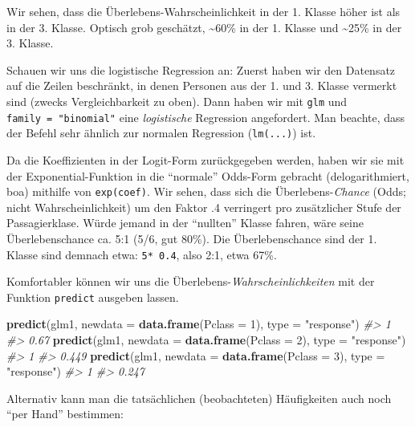 \documentclass[12pt,ngerman,]{book}
\makeatletter
\newenvironment{Shaded}{\begin{snugshade}}{\end{snugshade}}
\newcommand{\KeywordTok}[1]{\textcolor[rgb]{0.13,0.29,0.53}{\textbf{#1}}}
\newcommand{\DataTypeTok}[1]{\textcolor[rgb]{0.13,0.29,0.53}{#1}}
\newcommand{\DecValTok}[1]{\textcolor[rgb]{0.00,0.00,0.81}{#1}}
\newcommand{\StringTok}[1]{\textcolor[rgb]{0.31,0.60,0.02}{#1}}
\newcommand{\CommentTok}[1]{\textcolor[rgb]{0.56,0.35,0.01}{\textit{#1}}}
\newcommand{\NormalTok}[1]{#1}
\newenvironment{kframe}{%
\medskip{}
\setlength{\fboxsep}{.8em}
 \def\at@end@of@kframe{}%
 \ifinner\ifhmode%
  \def\at@end@of@kframe{\end{minipage}}%
  \begin{minipage}{\columnwidth}%
 \fi\fi%
 \def\FrameCommand##1{\hskip\@totalleftmargin \hskip-\fboxsep
 \colorbox{shadecolor}{##1}\hskip-\fboxsep
     \hskip-\linewidth \hskip-\@totalleftmargin \hskip\columnwidth}%
 \MakeFramed {\advance\hsize-\width
   \@totalleftmargin\z@ \linewidth\hsize
   \@setminipage}}%
 {\par\unskip\endMakeFramed%
 \at@end@of@kframe}
\renewenvironment{Shaded}{\begin{kframe}}{\end{kframe}}
\theoremstyle{definition}
\theoremstyle{definition}
\theoremstyle{remark}
\makeatother
\begin{document}
Wir sehen, dass die Überlebens-Wahrscheinlichkeit in der 1. Klasse höher
ist als in der 3. Klasse. Optisch grob geschätzt, \textasciitilde{}60\%
in der 1. Klasse und \textasciitilde{}25\% in der 3. Klasse.

Schauen wir uns die logistische Regression an: Zuerst haben wir den
Datensatz auf die Zeilen beschränkt, in denen Personen aus der 1. und 3.
Klasse vermerkt sind (zwecks Vergleichbarkeit zu oben). Dann haben wir
mit \texttt{glm} und \texttt{family\ =\ "binomial"} eine
\emph{logistische} Regression angefordert. Man beachte, dass der Befehl
sehr ähnlich zur normalen Regression (\texttt{lm(...)}) ist.

Da die Koeffizienten in der Logit-Form zurückgegeben werden, haben wir
sie mit der Exponential-Funktion in die ``normale'' Odds-Form gebracht
(delogarithmiert, boa) mithilfe von \texttt{exp(coef)}. Wir sehen, dass
sich die Überlebens-\emph{Chance} (Odds; nicht Wahrscheinlichkeit) um
den Faktor .4 verringert pro zusätzlicher Stufe der Passagierklase.
Würde jemand in der ``nullten'' Klasse fahren, wäre seine
Überlebenschance ca. 5:1 (5/6, gut 80\%). Die Überlebenschance sind der
1. Klasse sind demnach etwa: \texttt{5*\ 0.4}, also 2:1, etwa 67\%.

Komfortabler können wir uns die Überlebens-\emph{Wahrscheinlichkeiten}
mit der Funktion \texttt{predict} ausgeben lassen.

\begin{Shaded}
\begin{Highlighting}[]
\KeywordTok{predict}\NormalTok{(glm1, }\DataTypeTok{newdata =} \KeywordTok{data.frame}\NormalTok{(}\DataTypeTok{Pclass =} \DecValTok{1}\NormalTok{), }\DataTypeTok{type =} \StringTok{"response"}\NormalTok{)}
\CommentTok{#>    1 }
\CommentTok{#> 0.67}
\KeywordTok{predict}\NormalTok{(glm1, }\DataTypeTok{newdata =} \KeywordTok{data.frame}\NormalTok{(}\DataTypeTok{Pclass =} \DecValTok{2}\NormalTok{), }\DataTypeTok{type =} \StringTok{"response"}\NormalTok{)}
\CommentTok{#>     1 }
\CommentTok{#> 0.449}
\KeywordTok{predict}\NormalTok{(glm1, }\DataTypeTok{newdata =} \KeywordTok{data.frame}\NormalTok{(}\DataTypeTok{Pclass =} \DecValTok{3}\NormalTok{), }\DataTypeTok{type =} \StringTok{"response"}\NormalTok{)}
\CommentTok{#>     1 }
\CommentTok{#> 0.247}
\end{Highlighting}
\end{Shaded}

Alternativ kann man die tatsächlichen (beobachteten) Häufigkeiten auch
noch ``per Hand'' bestimmen:
\end{document}
